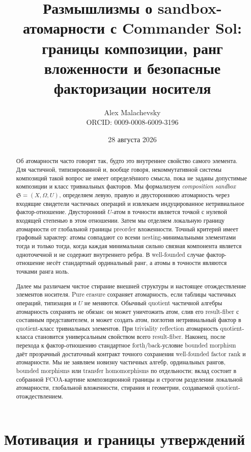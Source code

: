 \documentclass[11pt]{article}
\title{Размышлизмы о sandbox-атомарности с Commander Sol:\\границы композиции, ранг вложенности и безопасные факторизации носителя}
\author{Alex Malachevsky\\\small ORCID: 0009-0008-6009-3196}
\date{28 августа 2026}
\theoremstyle{definition}
\theoremstyle{remark}
\newcommand{\Sbx}{\mathfrak S}
\begin{document}
\maketitle

\begin{abstract}
Об атомарности часто говорят так, будто это внутреннее свойство самого элемента. Для частичной, типизированной и, вообще говоря, некоммутативной системы композиций такой вопрос не имеет определённого смысла, пока не заданы допустимые композиции и класс тривиальных факторов. Мы формализуем \emph{composition sandbox} \(\Sbx=(X,\Omega,U)\), определяем левую, правую и двустороннюю атомарность через входящие свидетели частичных операций и извлекаем индуцированное нетривиальное фактор-отношение. Двусторонний \(U\)-атом в точности является точкой с нулевой входящей степенью в этом отношении. Затем мы отделяем локальную границу атомарности от глобальной границы preorder вложенности. Точный критерий имеет графовый характер: атомы совпадают со всеми nesting-минимальными элементами тогда и только тогда, когда каждая минимальная сильно связная компонента является одноточечной и не содержит внутреннего ребра. В well-founded случае фактор-отношение несёт стандартный ординальный ранг, а атомы в точности являются точками ранга ноль.

Далее мы различаем чистое стирание внешней структуры и настоящее отождествление элементов носителя. Pure erasure сохраняет атомарность, если таблицы частичных операций, типизация и \(U\) не меняются. Обычный quotient частичной алгебры атомарность сохранять не обязан: он может уничтожить атом, слив его result-fiber с составным представителем, и может создать атом, поглотив нетривиальный фактор в quotient-класс тривиальных элементов. При triviality reflection атомарность quotient-класса становится универсальным свойством всего result-fiber. Наконец, после перехода к фактор-отношению стандартное forth/back-условие bounded morphism даёт прозрачный достаточный контракт точного сохранения well-founded factor rank и атомарности. Мы не заявляем новизну частичных алгебр, ординальных рангов, bounded morphisms или transfer homomorphisms по отдельности; вклад состоит в собранной FCOA-картине композиционной границы и строгом разделении локальной атомарности, глобальной вложенности, стирания и геометрии, создаваемой quotient-отождествлением.
\end{abstract}

\section{Мотивация и границы утверждений}
\end{document}
